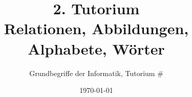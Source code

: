 




\title[Relationen, Abbildungen, Alphabete, Wörter]{2. Tutorium\\ Relationen, Abbildungen, Alphabete, Wörter}
\subtitle{Grundbegriffe der Informatik, Tutorium \#\mytutnumber}
\date{\today}


\titleframe
\roadmap



	
